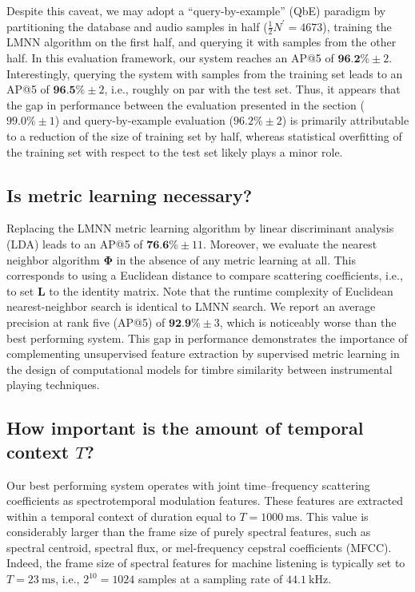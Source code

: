 \documentclass{bmcart}
\newcommand{\ja}[1]{\textcolor{purple}{JA: #1}\xspace}
\newcommand{\lnameref}[1]{%
\bgroup
\let\nmu\MakeLowercase
\nameref{#1}\egroup}
\newcommand{\nmu}{}
\begin{document}
Despite this caveat, we may adopt a ``query-by-example'' (QbE) paradigm by  partitioning the database and audio samples in half ($\frac{1}{2}N^{\prime}=4673$), training the LMNN algorithm on the first half, and querying it with samples from the other half.
In this evaluation framework, our system reaches an AP@5 of $\textbf{96.2\%} \pm 2$.
Interestingly, querying the system with samples from the training set leads to an AP@5 of $\textbf{96.5\%} \pm 2$, i.e., roughly on par with the test set.
Thus, it appears that the gap in performance between the evaluation presented in the \lnameref{sec:results} section ($99.0\%\pm 1$) and query-by-example evaluation ($96.2\% \pm 2$) is primarily attributable to a reduction of the size of training set by half, whereas statistical overfitting of the training set with respect to the test set likely plays a minor role.


\subsection*{Is metric learning necessary?}
Replacing the LMNN metric learning algorithm by linear discriminant analysis (LDA) leads to an AP@5 of $\textbf{76.6}\% \pm 11$.
Moreover, we evaluate the nearest neighbor algorithm $\mathbf{\Phi}$ in the absence of any metric learning at all. %
This corresponds to using a Euclidean distance to compare scattering coefficients, i.e., to set $\mathbf{L}$ to the identity matrix.
Note that the runtime complexity of Euclidean nearest-neighbor search is identical to LMNN search. %
We report an average precision at rank five (AP@5) of $\textbf{92.9\%} \pm 3$, which is noticeably worse than the best performing system.
This gap in performance demonstrates the importance of complementing unsupervised feature extraction by supervised metric learning in the design  of computational models for timbre similarity between instrumental playing techniques.

\subsection*{How important is the amount of temporal context $T$?}

Our best performing system operates with joint time--frequency scattering coefficients as spectrotemporal modulation features.
These features are extracted within a temporal context of duration equal to $T=\SI{1000}{\milli\second}$.
This value is considerably larger than the frame size of purely spectral features, such as spectral centroid, spectral flux, or mel-frequency cepstral coefficients (MFCC).
Indeed, the frame size of spectral features for machine listening is typically set to $T=\SI{23}{\milli\second}$, i.e., $2^{10}=1024$ samples at a sampling rate of $\SI{44,1}{\kilo\hertz}$.
\end{document}

